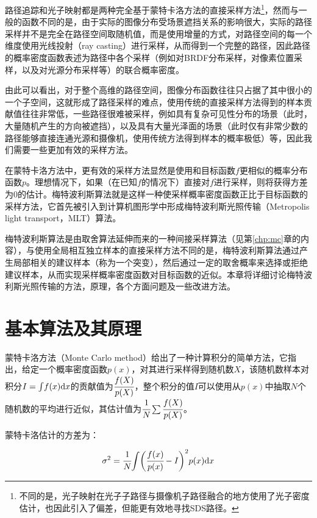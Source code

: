 路径追踪和光子映射都是两种完全基于蒙特卡洛方法的直接采样方法\footnote{不同的是，光子映射在光子子路径与摄像机子路径融合的地方使用了光子密度估计，也因此引入了偏差，但能更有效地寻找SDS路径。}，然而与一般的函数不同的是，由于实际的图像分布受场景遮挡关系的影响很大，实际的路径采样并不是完全在路径空间取随机值，而是使用增量的方式，对路径空间的每一个维度使用光线投射（ray casting）进行采样，从而得到一个完整的路径，因此路径的概率密度函数表述为路径中各个采样（例如对BRDF分布采样，对像素位置采样，以及对光源分布采样等）的联合概率密度。

由此可以看出，对于整个高维的路径空间，图像分布函数往往只占据了其中很小的一个子空间，这就形成了路径采样的难点，使用传统的直接采样方法得到的样本贡献值往往非常低，一些路径很难被采样，例如具有复杂可见性分布的场景（此时，大量随机产生的方向被遮挡），以及具有大量光泽面的场景（此时仅有非常少数的路径能够直接连通光源和摄像机，使用传统方法得到样本的概率极低）等，因此我们需要一些更加有效的采样方法。

在蒙特卡洛方法中，更有效的采样方法显然是使用和目标函数$f$更相似的概率分布函数$p$。理想情况下，如果（在已知$f$的情况下）直接对$f$进行采样，则将获得方差为0的估计。梅特波利斯算法就是这样一种使采样概率密度函数正比于目标函数的采样方法，它首先被\cite{a:MetropolisLightTransport}引入到计算机图形学中形成梅特波利斯光照传输（Metropolis light transport，MLT）算法。

梅特波利斯算法是由取舍算法延伸而来的一种间接采样算法（见第\ref{chp:mc}章的内容），与使用全局相互独立样本的直接采样方法不同的是，梅特波利斯算法通过产生局部相关的建议样本（称为一个突变），然后通过一定的取舍概率来选择或拒绝建议样本，从而实现采样概率密度函数对目标函数的近似。本章将详细讨论梅特波利斯光照传输的方法，原理，各个方面问题及一些改进方法。




\section{基本算法及其原理}\label{sec:mlt-mlt}
蒙特卡洛方法（Monte Carlo method）给出了一种计算积分的简单方法，它指出，给定一个概率密度函数$p(x)$，对其进行采样得到随机数$X$，该随机数样本对积分$I={\rm \int} f(x){\rm d}x$的贡献值为$\cfrac{f(X)}{p(X)}$，整个积分的值$I$可以使用从$p(x)$中抽取$N$个随机数的平均进行近似，其估计值为$ \cfrac{1}{N}\sum \cfrac{f(X)}{p(X)}$。

蒙特卡洛估计的方差为：

\begin{equation}
	\sigma^{2}= \cfrac{1}{N}{\rm \int} \bigg( \cfrac{f(x)}{p(x)}-I\bigg)^{2}p(x){\rm d}x
\end{equation}

